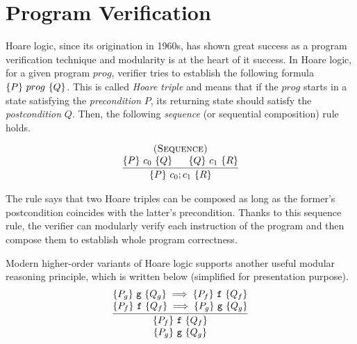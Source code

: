 \chapter{\;\;\;\;Program Verification}
\label{sec:program}

Hoare logic, since its origination in 1960s, has shown great success as a program verification technique and modularity is at the heart of it success.
In Hoare logic, for a given program $prog$, verifier tries to establish the following formula $\{{P}\}~{prog}~\{{Q}\}$.
This is called {\it Hoare triple} and means that if the $prog$ starts in a state satisfying the {\it precondition} $P$,
its returning state should satisfy the {\it postcondition} $Q$.
Then, the following {\it sequence} (or sequential composition) rule holds.

\[
\infer
    {\hoare{P}{c_{0} ; c_{1}}{R}}
    {\deduce{\hoare{P}{c_{0}}{Q} \;\;\;\;\;\; \hoare{Q}{c_{1}}{R}}
      {\textsc{(Sequence)}}}
\]

\noindent The rule says that two Hoare triples can be composed as long as the former's postcondition coincides with the latter's precondition. Thanks to this sequence rule, the verifier can modularly verify each instruction of the program and then compose them to establish whole program correctness.



Modern higher-order variants of Hoare logic\cite{VST,appel:plcc} supports another useful modular reasoning principle, which is written below (simplified for presentation purpose).%
\[
\infer
    {\deduce{\hoare{P_{g}}{\code{g}}{Q_{g}}}{\hoare{P_{f}}{\code{f}}{Q_{f}}}}
    {\deduce{\hoare{P_{f}}{\code{f}}{Q_{f}} \implies \hoare{P_{g}}{\code{g}}{Q_{g}}}
            {\hoare{P_{g}}{\code{g}}{Q_{g}} \implies \hoare{P_{f}}{\code{f}}{Q_{f}}}
    }
\]

